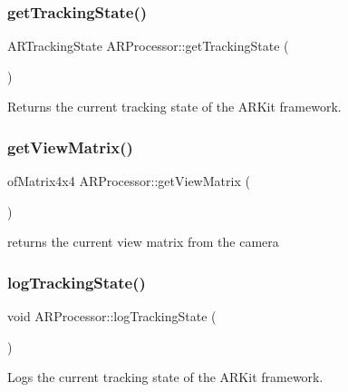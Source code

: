 \subsubsection{\texorpdfstring{get\+Tracking\+State()}{getTrackingState()}}
{\footnotesize\ttfamily A\+R\+Tracking\+State A\+R\+Processor\+::get\+Tracking\+State (\begin{DoxyParamCaption}{ }\end{DoxyParamCaption})}



Returns the current tracking state of the A\+R\+Kit framework. 

\mbox{\label{class_a_r_processor_a2e1d4cde9029bad28ac797c94e73096a}} 
\subsubsection{\texorpdfstring{get\+View\+Matrix()}{getViewMatrix()}}
{\footnotesize\ttfamily of\+Matrix4x4 A\+R\+Processor\+::get\+View\+Matrix (\begin{DoxyParamCaption}{ }\end{DoxyParamCaption})\hspace{0.3cm}{\ttfamily [inline]}}



returns the current view matrix from the camera 

\mbox{\label{class_a_r_processor_a3ae7b56c7d5f555ec84dbd1f1f0a8f65}} 
\subsubsection{\texorpdfstring{log\+Tracking\+State()}{logTrackingState()}}
{\footnotesize\ttfamily void A\+R\+Processor\+::log\+Tracking\+State (\begin{DoxyParamCaption}{ }\end{DoxyParamCaption})}



Logs the current tracking state of the A\+R\+Kit framework. 

\mbox{\label{class_a_r_processor_a035d352220785ee03e1bb15ba6bf688d}} 
